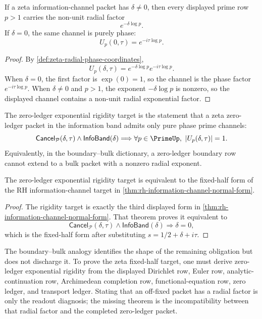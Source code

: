 \begin{proposition}
\label{prop:off-fixed-packets-carry-radial-exponent}
If a zeta information-channel packet has $\delta\neq0$, then every
displayed prime row $p>1$ carries the non-unit radial factor
$$
e^{-\delta\log p}.
$$
If $\delta=0$, the same channel is purely phase:
$$
U_p(0,\tau)=e^{-i\tau\log p}.
$$
\end{proposition}

\begin{proof}
By \autoref{def:zeta-radial-phase-coordinates},
$$
U_p(\delta,\tau)=e^{-\delta\log p}e^{-i\tau\log p}.
$$
When $\delta=0$, the first factor is $\exp(0)=1$, so the channel is the
phase factor $e^{-i\tau\log p}$. When $\delta\neq0$ and $p>1$, the
exponent $-\delta\log p$ is nonzero, so the displayed channel contains a
non-unit radial exponential factor.
\end{proof}

\begin{definition}
\label{def:zero-ledger-exponential-rigidity-target}
The zero-ledger exponential rigidity target is the statement that a zeta
zero-ledger packet in the information band admits only pure phase prime
channels:
$$
\mathsf{Cancel}_{\mathcal P}(\delta,\tau)
\wedge
\mathsf{InfoBand}(\delta)
\Longrightarrow
\forall p\in\PrimeUp,\ |U_p(\delta,\tau)|=1.
$$
Equivalently, in the boundary--bulk dictionary, a zero-ledger boundary row
cannot extend to a bulk packet with a nonzero radial exponent.
\end{definition}

\begin{theorem}
\label{thm:exponential-rigidity-fixed-half-obligation}
The zero-ledger exponential rigidity target is equivalent to the
fixed-half form of the RH information-channel target in
\autoref{thm:rh-information-channel-normal-form}.
\end{theorem}

\begin{proof}
The rigidity target is exactly the third displayed form in
\autoref{thm:rh-information-channel-normal-form}. That theorem proves it
equivalent to
$$
\mathsf{Cancel}_{\mathcal P}(\delta,\tau)
\wedge
\mathsf{InfoBand}(\delta)
\Longrightarrow
\delta=0,
$$
which is the fixed-half form after substituting
$s=1/2+\delta+i\tau$.
\end{proof}

\begin{principle}
\label{prin:holographic-proof-boundary}
The boundary--bulk analogy identifies the shape of the remaining
obligation but does not discharge it. To prove the zeta fixed-half target,
one must derive zero-ledger exponential rigidity from the displayed
Dirichlet row, Euler row, analytic-continuation row, Archimedean
completion row, functional-equation row, zero ledger, and transport
ledger. Stating that an off-fixed packet has a radial factor is only the
readout diagnosis; the missing theorem is the incompatibility between
that radial factor and the completed zero-ledger packet.
\end{principle}

